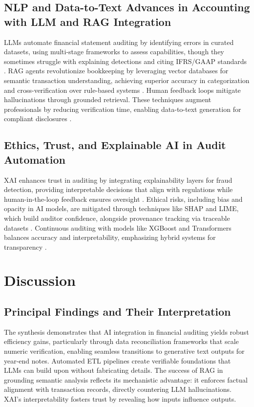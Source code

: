\subsection{NLP and Data-to-Text Advances in Accounting with LLM and RAG Integration}
LLMs automate financial statement auditing by identifying errors in curated datasets, using multi-stage frameworks to assess capabilities, though they sometimes struggle with explaining detections and citing IFRS/GAAP standards \cite{Rushi2025a, Rushi2025b}. RAG agents revolutionize bookkeeping by leveraging vector databases for semantic transaction understanding, achieving superior accuracy in categorization and cross-verification over rule-based systems \cite{Vemulapalli2025}. Human feedback loops mitigate hallucinations through grounded retrieval. These techniques augment professionals by reducing verification time, enabling data-to-text generation for compliant disclosures \cite{Brij2025}.

\subsection{Ethics, Trust, and Explainable AI in Audit Automation}
XAI enhances trust in auditing by integrating explainability layers for fraud detection, providing interpretable decisions that align with regulations while human-in-the-loop feedback ensures oversight \cite{Zhong2024, Vardhan2021}. Ethical risks, including bias and opacity in AI models, are mitigated through techniques like SHAP and LIME, which build auditor confidence, alongside provenance tracking via traceable datasets \cite{Boggavarapu2025, Bran2024}. Continuous auditing with models like XGBoost and Transformers balances accuracy and interpretability, emphasizing hybrid systems for transparency \cite{Wibowo2025}.

\section{Discussion}

\subsection{Principal Findings and Their Interpretation}
The synthesis demonstrates that AI integration in financial auditing yields robust efficiency gains, particularly through data reconciliation frameworks that scale numeric verification, enabling seamless transitions to generative text outputs for year-end notes. Automated ETL pipelines create verifiable foundations that LLMs can build upon without fabricating details. The success of RAG in grounding semantic analysis reflects its mechanistic advantage: it enforces factual alignment with transaction records, directly countering LLM hallucinations. XAI's interpretability fosters trust by revealing how inputs influence outputs.

